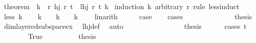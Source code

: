 \begin{isabellebody}
\isanewline
%
\endisadelimproof
\isanewline
\isanewline
\isanewline
{}\isamarkupfalse%
\ theorem{}{\isacharcolon}{\kern0pt}\ \ k\ \ {\isachardoublequoteopen}{\isasymAnd}r{\isacharprime}{\kern0pt}{\isachardot}{\kern0pt}\ hj\ r{\isacharprime}{\kern0pt}\ t{\isachardoublequoteclose}\ \ {\isachardoublequoteopen}lhj\ r\ t\ k{\isachardoublequoteclose}\isanewline
%
\isadelimproof
%
\endisadelimproof
%
\isatagproof
{}\isamarkupfalse%
\ {\isacharparenleft}{\kern0pt}induction\ k\ arbitrary{\isacharcolon}{\kern0pt}\ r\ rule{\isacharcolon}{\kern0pt}\ less{\isacharunderscore}{\kern0pt}induct{\isacharparenright}{\kern0pt}\isanewline
\ \ \isamarkupfalse%
\ {\isacharparenleft}{\kern0pt}less\ k{\isacharparenright}{\kern0pt}\isanewline
\ \ \isamarkupfalse%
\ {\isachardoublequoteopen}k\ {\isacharequal}{\kern0pt}\ {}{\isachardoublequoteclose}\ {\isacharbar}{\kern0pt}\ {\isachardoublequoteopen}k\ {\isacharequal}{\kern0pt}\ {}{\isachardoublequoteclose}\ {\isacharbar}{\kern0pt}\ {\isachardoublequoteopen}k\ {\isasymge}\ {}{\isachardoublequoteclose}\ \isamarkupfalse%
\ linarith\isanewline
\ \ \isamarkupfalse%
\ \isamarkupfalse%
\ {\isacharquery}{\kern0pt}case\isanewline
\ \ \isamarkupfalse%
\ {\isacharparenleft}{\kern0pt}cases{\isacharparenright}{\kern0pt}\isanewline
\ \ \ \ \isamarkupfalse%
\ {}\isanewline
\ \ \ \ \isamarkupfalse%
\ \isamarkupfalse%
\ {\isacharquery}{\kern0pt}thesis\ \isamarkupfalse%
\ dim{}{\isacharunderscore}{\kern0pt}layered{\isacharunderscore}{\kern0pt}subspace{\isacharunderscore}{\kern0pt}ex\ \isamarkupfalse%
\ lhj{\isacharunderscore}{\kern0pt}def\ \isamarkupfalse%
\ auto\isanewline
\ \ \isamarkupfalse%
\isanewline
\ \ \ \ \isamarkupfalse%
\ {}\isanewline
\ \ \ \ \isamarkupfalse%
\ \isamarkupfalse%
\ {\isacharquery}{\kern0pt}thesis\isanewline
\ \ \ \ \isamarkupfalse%
\ {\isacharparenleft}{\kern0pt}cases\ {\isachardoublequoteopen}t\ {\isachargreater}{\kern0pt}\ {}{\isachardoublequoteclose}{\isacharparenright}{\kern0pt}\isanewline
\ \ \ \ \ \ \isamarkupfalse%
\ True\isanewline
\ \ \ \ \ \ \isamarkupfalse%
\ \isamarkupfalse%
\ {\isacharquery}{\kern0pt}thesis\ \isamarkupfalse%

\end{isabellebody}
